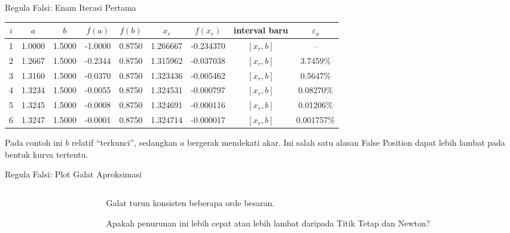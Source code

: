\documentclass[aspectratio=169,10pt]{beamer}
\begin{document}
\begin{frame}{Regula Falsi: Enam Iterasi Pertama}
\tiny
\renewcommand{\arraystretch}{1.08}
\begin{adjustbox}{max width=\linewidth,center}
\begin{tabular}{c c c c c c c c c}
\toprule
$i$ & $a$ & $b$ & $f(a)$ & $f(b)$ & $x_r$ & $f(x_r)$ & interval baru & $\varepsilon_a$\\
\midrule
1 & 1.0000 & 1.5000 & -1.0000 & 0.8750 & 1.266667 & -0.234370 & $[x_r,b]$ & --\\
2 & 1.2667 & 1.5000 & -0.2344 & 0.8750 & 1.315962 & -0.037038 & $[x_r,b]$ & 3.7459\%\\
3 & 1.3160 & 1.5000 & -0.0370 & 0.8750 & 1.323436 & -0.005462 & $[x_r,b]$ & 0.5647\%\\
4 & 1.3234 & 1.5000 & -0.0055 & 0.8750 & 1.324531 & -0.000797 & $[x_r,b]$ & 0.08270\%\\
5 & 1.3245 & 1.5000 & -0.0008 & 0.8750 & 1.324691 & -0.000116 & $[x_r,b]$ & 0.01206\%\\
6 & 1.3247 & 1.5000 & -0.0001 & 0.8750 & 1.324714 & -0.000017 & $[x_r,b]$ & 0.001757\%\\
\bottomrule
\end{tabular}
\end{adjustbox}
\begin{bluebox}[Perhatikan]
Pada contoh ini \(b\) relatif ``terkunci'', sedangkan \(a\) bergerak mendekati akar. Ini salah satu alasan False Position dapat lebih lambat pada bentuk kurva tertentu.
\end{bluebox}
\end{frame}

\begin{frame}{Regula Falsi: Plot Galat Aproksimasi}
\small
\begin{columns}[T,totalwidth=\textwidth]
\begin{column}{.66\textwidth}
\end{column}
\begin{column}{.29\textwidth}
\begin{orangebox}[Interpretasi]
Galat turun konsisten beberapa orde besaran.
\end{orangebox}
\begin{goldbox}
Apakah penurunan ini lebih cepat atau lebih lambat daripada Titik Tetap dan Newton?
\end{goldbox}
\end{column}
\end{columns}
\end{frame}
\end{document}
